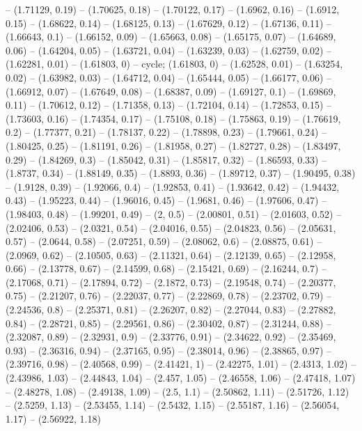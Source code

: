 -- (1.71129, 0.19)
-- (1.70625, 0.18)
-- (1.70122, 0.17)
-- (1.6962, 0.16)
-- (1.6912, 0.15)
-- (1.68622, 0.14)
-- (1.68125, 0.13)
-- (1.67629, 0.12)
-- (1.67136, 0.11)
-- (1.66643, 0.1)
-- (1.66152, 0.09)
-- (1.65663, 0.08)
-- (1.65175, 0.07)
-- (1.64689, 0.06)
-- (1.64204, 0.05)
-- (1.63721, 0.04)
-- (1.63239, 0.03)
-- (1.62759, 0.02)
-- (1.62281, 0.01)
-- (1.61803, 0)
-- cycle;
\drawBand (1.61803, 0)
-- (1.62528, 0.01)
-- (1.63254, 0.02)
-- (1.63982, 0.03)
-- (1.64712, 0.04)
-- (1.65444, 0.05)
-- (1.66177, 0.06)
-- (1.66912, 0.07)
-- (1.67649, 0.08)
-- (1.68387, 0.09)
-- (1.69127, 0.1)
-- (1.69869, 0.11)
-- (1.70612, 0.12)
-- (1.71358, 0.13)
-- (1.72104, 0.14)
-- (1.72853, 0.15)
-- (1.73603, 0.16)
-- (1.74354, 0.17)
-- (1.75108, 0.18)
-- (1.75863, 0.19)
-- (1.76619, 0.2)
-- (1.77377, 0.21)
-- (1.78137, 0.22)
-- (1.78898, 0.23)
-- (1.79661, 0.24)
-- (1.80425, 0.25)
-- (1.81191, 0.26)
-- (1.81958, 0.27)
-- (1.82727, 0.28)
-- (1.83497, 0.29)
-- (1.84269, 0.3)
-- (1.85042, 0.31)
-- (1.85817, 0.32)
-- (1.86593, 0.33)
-- (1.8737, 0.34)
-- (1.88149, 0.35)
-- (1.8893, 0.36)
-- (1.89712, 0.37)
-- (1.90495, 0.38)
-- (1.9128, 0.39)
-- (1.92066, 0.4)
-- (1.92853, 0.41)
-- (1.93642, 0.42)
-- (1.94432, 0.43)
-- (1.95223, 0.44)
-- (1.96016, 0.45)
-- (1.9681, 0.46)
-- (1.97606, 0.47)
-- (1.98403, 0.48)
-- (1.99201, 0.49)
-- (2, 0.5)
-- (2.00801, 0.51)
-- (2.01603, 0.52)
-- (2.02406, 0.53)
-- (2.0321, 0.54)
-- (2.04016, 0.55)
-- (2.04823, 0.56)
-- (2.05631, 0.57)
-- (2.0644, 0.58)
-- (2.07251, 0.59)
-- (2.08062, 0.6)
-- (2.08875, 0.61)
-- (2.0969, 0.62)
-- (2.10505, 0.63)
-- (2.11321, 0.64)
-- (2.12139, 0.65)
-- (2.12958, 0.66)
-- (2.13778, 0.67)
-- (2.14599, 0.68)
-- (2.15421, 0.69)
-- (2.16244, 0.7)
-- (2.17068, 0.71)
-- (2.17894, 0.72)
-- (2.1872, 0.73)
-- (2.19548, 0.74)
-- (2.20377, 0.75)
-- (2.21207, 0.76)
-- (2.22037, 0.77)
-- (2.22869, 0.78)
-- (2.23702, 0.79)
-- (2.24536, 0.8)
-- (2.25371, 0.81)
-- (2.26207, 0.82)
-- (2.27044, 0.83)
-- (2.27882, 0.84)
-- (2.28721, 0.85)
-- (2.29561, 0.86)
-- (2.30402, 0.87)
-- (2.31244, 0.88)
-- (2.32087, 0.89)
-- (2.32931, 0.9)
-- (2.33776, 0.91)
-- (2.34622, 0.92)
-- (2.35469, 0.93)
-- (2.36316, 0.94)
-- (2.37165, 0.95)
-- (2.38014, 0.96)
-- (2.38865, 0.97)
-- (2.39716, 0.98)
-- (2.40568, 0.99)
-- (2.41421, 1)
-- (2.42275, 1.01)
-- (2.4313, 1.02)
-- (2.43986, 1.03)
-- (2.44843, 1.04)
-- (2.457, 1.05)
-- (2.46558, 1.06)
-- (2.47418, 1.07)
-- (2.48278, 1.08)
-- (2.49138, 1.09)
-- (2.5, 1.1)
-- (2.50862, 1.11)
-- (2.51726, 1.12)
-- (2.5259, 1.13)
-- (2.53455, 1.14)
-- (2.5432, 1.15)
-- (2.55187, 1.16)
-- (2.56054, 1.17)
-- (2.56922, 1.18)
